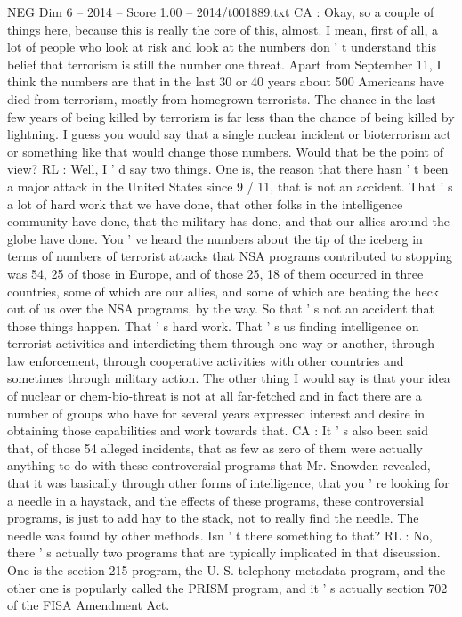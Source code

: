 \begin{textsample}{NEG Dim 6 – 2014 – Score 1.00 – 2014/t001889.txt}
CA : Okay, so a couple of things here, because this is really the core of this, almost.
I mean, first of all, a lot of people who look at risk and look at the numbers don ' t understand this belief that terrorism is still the number one threat.
Apart from September 11, I think the numbers are that in the last 30 or 40 years about 500 Americans have died from terrorism, mostly from homegrown terrorists.
The chance in the last few years of being killed by terrorism is far less than the chance of being killed by lightning.
I guess you would say that a single nuclear incident or bioterrorism act or something like that would change those numbers.
Would that be the point of view?
RL : Well, I ' d say two things.
One is, the reason that there hasn ' t been a major attack in the United States since 9 / 11, that is not an accident.
That ' s a lot of hard work that we have done, that other folks in the intelligence community have done, that the military has done, and that our allies around the globe have done.
You ' ve heard the numbers about the tip of the iceberg in terms of numbers of terrorist attacks that NSA programs contributed to stopping was 54, 25 of those in Europe, and of those 25, 18 of them occurred in three countries, some of which are our allies, and some of which are beating the heck out of us over the NSA programs, by the way.
So that ' s not an accident that those things happen.
That ' s hard work.
That ' s us finding intelligence on terrorist activities and interdicting them through one way or another, through law enforcement, through cooperative activities with other countries and sometimes through military action.
The other thing I would say is that your idea of nuclear or chem-bio-threat is not at all far-fetched and in fact there are a number of groups who have for several years expressed interest and desire in obtaining those capabilities and work towards that.
CA : It ' s also been said that, of those 54 alleged incidents, that as few as zero of them were actually anything to do with these controversial programs that Mr.
Snowden revealed, that it was basically through other forms of intelligence, that you ' re looking for a needle in a haystack, and the effects of these programs, these controversial programs, is just to add hay to the stack, not to really find the needle.
The needle was found by other methods.
Isn ' t there something to that?
RL : No, there ' s actually two programs that are typically implicated in that discussion.
One is the section 215 program, the U.
S. telephony metadata program, and the other one is popularly called the PRISM program, and it ' s actually section 702 of the FISA Amendment Act.

\end{textsample}
